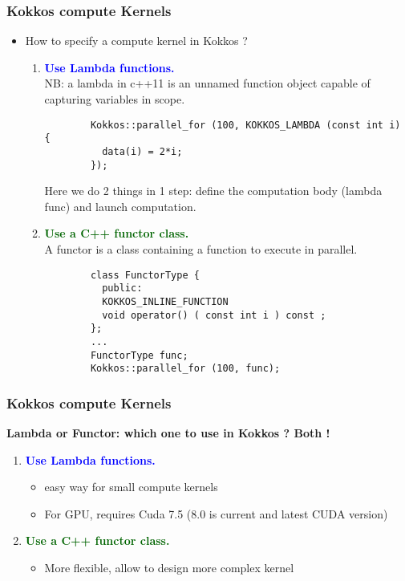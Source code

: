 \begin{frame}[fragile=singleslide]
  \frametitle{Kokkos compute Kernels}

  \begin{itemize}
  \item How to specify a compute kernel in Kokkos ?
    \begin{enumerate}
    \item \textcolor{blue}{\textbf{Use Lambda functions.}}\\
      NB: a lambda in c++11 is an unnamed function object capable of capturing variables in scope.
      \begin{verbatim}
        Kokkos::parallel_for (100, KOKKOS_LAMBDA (const int i) {
          data(i) = 2*i;
        });
      \end{verbatim}
      Here we do 2 things in 1 step: define the computation body (lambda func) and launch computation.
    \item \textcolor{darkgreen}{\textbf{Use a C++ functor class.}}\\
      A functor is a class containing a function to execute in parallel.
      \begin{verbatim}
        class FunctorType {
          public:
          KOKKOS_INLINE_FUNCTION
          void operator() ( const int i ) const ;
        };
        ...
        FunctorType func;
        Kokkos::parallel_for (100, func);
      \end{verbatim}
    \end{enumerate}
  \end{itemize}

\end{frame}


\begin{frame}[fragile=singleslide]
  \frametitle{Kokkos compute Kernels}

  \textbf{Lambda or Functor: which one to use in Kokkos ? Both !}
  \begin{enumerate}
  \item \textcolor{blue}{\textbf{Use Lambda functions.}}\\
    \begin{itemize}
    \item easy way for small compute kernels
    \item For GPU, requires Cuda 7.5 (8.0 is current and latest CUDA version)
    \end{itemize}
  \item \textcolor{darkgreen}{\textbf{Use a C++ functor class.}}\\
    \begin{itemize}
    \item More flexible, allow to design more complex kernel
    \end{itemize}
  \end{enumerate}
\end{frame}

